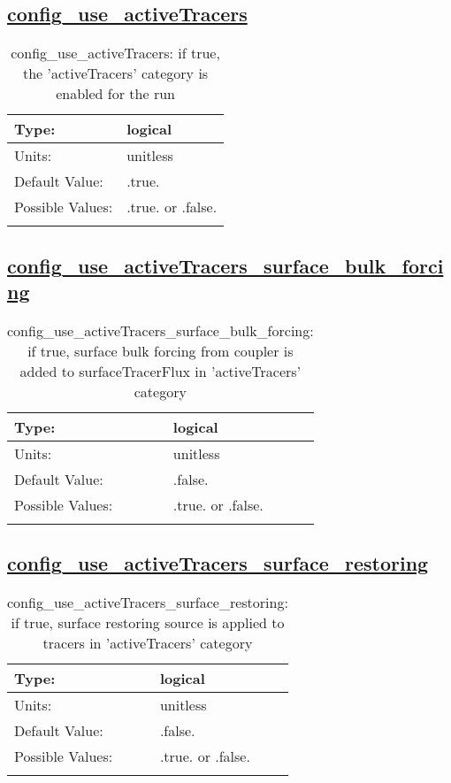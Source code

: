 \subsection[config\_use\_activeTracers]{\hyperref[sec:nm_tab_tracer_forcing_activeTracers]{config\_use\_activeTracers}}
\label{subsec:nm_sec_config_use_activeTracers}
\begin{center}
\begin{longtable}{| p{2.0in} || p{4.0in} |}
    \hline
    Type: & logical \\
    \hline
    Units: & \si{unitless} \\
    \hline
    Default Value: & .true. \\
    \hline
    Possible Values: & .true. or .false. \\
    \hline
    \caption{config\_use\_activeTracers: if true, the 'activeTracers' category is enabled for the run}
\end{longtable}
\end{center}
\subsection[config\_use\_activeTracers\_surface\_bulk\_forcing]{\hyperref[sec:nm_tab_tracer_forcing_activeTracers]{config\_use\_activeTracers\_surface\_bulk\_forcing}}
\label{subsec:nm_sec_config_use_activeTracers_surface_bulk_forcing}
\begin{center}
\begin{longtable}{| p{2.0in} || p{4.0in} |}
    \hline
    Type: & logical \\
    \hline
    Units: & \si{unitless} \\
    \hline
    Default Value: & .false. \\
    \hline
    Possible Values: & .true. or .false. \\
    \hline
    \caption{config\_use\_activeTracers\_surface\_bulk\_forcing: if true, surface bulk forcing from coupler is added to surfaceTracerFlux in 'activeTracers' category}
\end{longtable}
\end{center}
\subsection[config\_use\_activeTracers\_surface\_restoring]{\hyperref[sec:nm_tab_tracer_forcing_activeTracers]{config\_use\_activeTracers\_surface\_restoring}}
\label{subsec:nm_sec_config_use_activeTracers_surface_restoring}
\begin{center}
\begin{longtable}{| p{2.0in} || p{4.0in} |}
    \hline
    Type: & logical \\
    \hline
    Units: & \si{unitless} \\
    \hline
    Default Value: & .false. \\
    \hline
    Possible Values: & .true. or .false. \\
    \hline
    \caption{config\_use\_activeTracers\_surface\_restoring: if true, surface restoring source is applied to tracers in 'activeTracers' category}
\end{longtable}
\end{center}
